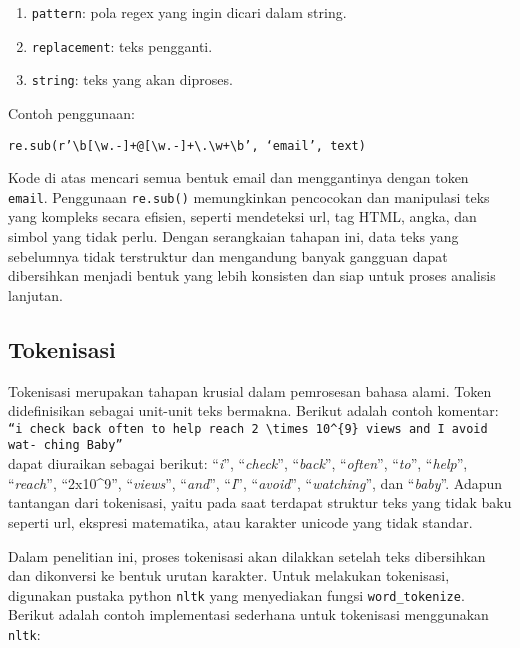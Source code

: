 \documentclass[a4paper,12pt]{report}
\numberwithin{equation}{chapter}
\begin{document}
\begin{enumerate}
    \item \texttt{pattern}: pola regex yang ingin dicari dalam string.
    \item \texttt{replacement}: teks pengganti.
    \item \texttt{string}: teks yang akan diproses.
\end{enumerate}

Contoh penggunaan:

\begin{center}
\texttt{re.sub(r'\textbackslash{}b[\textbackslash{}w.-]+@[\textbackslash{}w.-]+\textbackslash{}.\textbackslash{}w+\textbackslash{}b', `email', text)}
\end{center}

Kode di atas mencari semua bentuk email dan menggantinya dengan token \texttt{email}. Penggunaan \texttt{re.sub()} memungkinkan pencocokan dan manipulasi teks yang kompleks secara efisien, seperti mendeteksi url, tag HTML, angka, dan simbol yang tidak perlu.
Dengan serangkaian tahapan ini, data teks yang sebelumnya tidak terstruktur dan mengandung banyak gangguan dapat dibersihkan menjadi bentuk yang lebih konsisten dan siap untuk proses analisis lanjutan.


\subsection{Tokenisasi}
Tokenisasi merupakan tahapan krusial dalam pemrosesan bahasa alami. Token didefinisikan sebagai unit-unit teks bermakna. Berikut adalah contoh komentar:
\\
\texttt{``\textit{i check back often to help reach $2 \times 10^{9}$ views and I avoid  wat-}\\
\textit{ching Baby}''} \\
dapat diuraikan sebagai berikut:  ``\textit{i}'', ``\textit{check}'', ``\textit{back}'', ``\textit{often}'', ``\textit{to}'', ``\textit{help}'', ``\textit{reach}'', ``2x10\^{}9'', ``\textit{views}'', ``\textit{and}'', ``\textit{I}'', ``\textit{avoid}'', ``\textit{watching}'', dan ``\textit{baby}''. Adapun tantangan dari tokenisasi, yaitu pada saat terdapat struktur teks yang tidak baku seperti url, ekspresi matematika, atau karakter unicode yang tidak standar.

Dalam penelitian ini, proses tokenisasi akan dilakkan setelah teks dibersihkan dan dikonversi ke bentuk urutan karakter. Untuk melakukan tokenisasi, digunakan pustaka python \texttt{nltk} yang menyediakan fungsi \texttt{word\_tokenize}. Berikut adalah contoh implementasi sederhana untuk tokenisasi menggunakan \texttt{nltk}:
\end{document}
